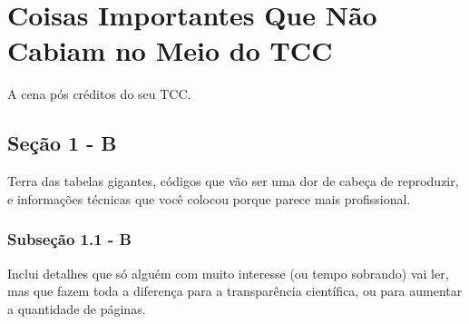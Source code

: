 %

\chapter{Coisas Importantes Que Não Cabiam no Meio do TCC}\label{apen:apendiceB}

A cena pós créditos do seu TCC. 

\section{Seção 1 - B}

Terra das tabelas gigantes, códigos que vão ser uma dor de cabeça de reproduzir, e informações técnicas que você colocou porque parece mais profissional.

\subsection{Subseção 1.1 - B}

Inclui detalhes que só alguém com muito interesse (ou tempo sobrando) vai ler, mas que fazem toda a diferença para a transparência científica, ou para aumentar a quantidade de páginas.
